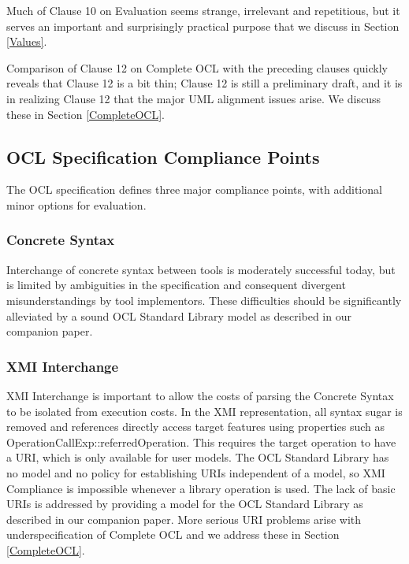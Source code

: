 \documentclass{eceasst}
\begin{document}
Much of Clause 10 on Evaluation seems strange, irrelevant and repetitious, but it serves an important and surprisingly practical purpose that we discuss in Section \ref{Values}.

Comparison of Clause 12 on Complete OCL with the preceding clauses quickly reveals that Clause 12 is a bit thin; Clause 12 is still a preliminary draft, and it is in realizing Clause 12 that the major UML alignment issues arise. We discuss these in Section \ref{CompleteOCL}.
 
\subsection{OCL Specification Compliance Points}

The OCL specification defines three major compliance points, with additional minor options for evaluation.

\subsubsection{Concrete Syntax}

Interchange of concrete syntax between tools is moderately successful today, but is limited by ambiguities in the specification and consequent divergent misunderstandings by tool implementors. These difficulties should be significantly alleviated by a sound OCL Standard Library model as described in our companion paper\cite{OCL-stdlib}.
 
\subsubsection{XMI Interchange}

XMI Interchange is important to allow the costs of parsing the Concrete Syntax to be isolated from execution costs. In the XMI representation, all syntax sugar is removed and references directly access target features using properties such as OperationCallExp::referredOperation. This requires the target operation to have a URI, which is only available for user models. The OCL Standard Library has no model and no policy for establishing URIs independent of a model, so XMI Compliance is impossible whenever a library operation is used. The lack of basic URIs is addressed by providing a model for the OCL Standard Library as described in our companion paper\cite{OCL-stdlib}. More serious URI problems arise with underspecification of Complete OCL and we address these in Section \ref{CompleteOCL}.
\end{document}
